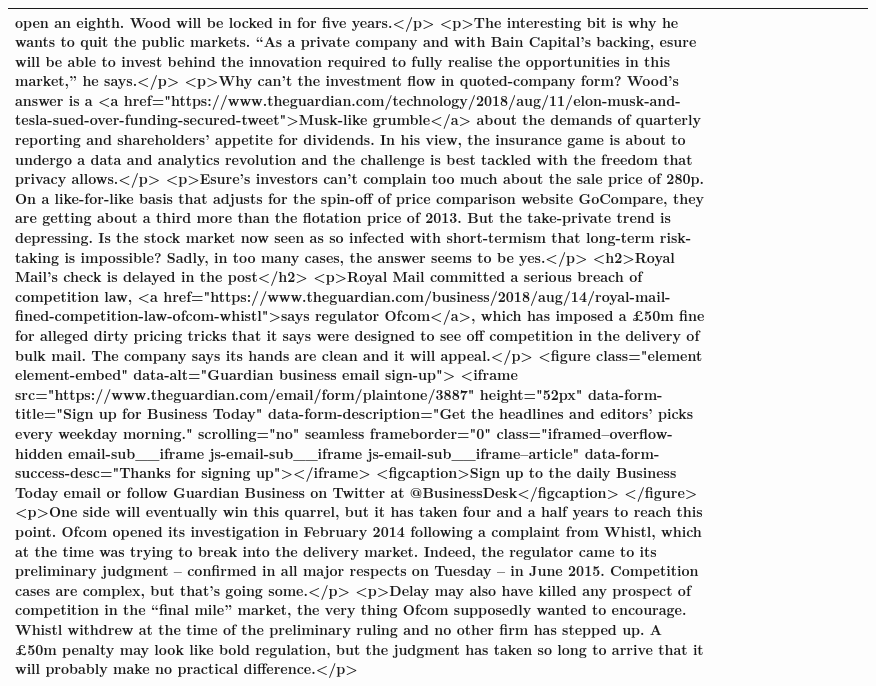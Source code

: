\documentclass[]{article}
\begin{document}
\begin{table}[!h]
\begin{tabular}[t]{llllllllllll}
open an eighth. Wood will be locked in for five years.</p> <p>The interesting bit is why he wants to quit the public markets. “As a private company and with Bain Capital’s backing, esure will be able to invest behind the innovation required to fully realise the opportunities in this market,” he says.</p> <p>Why can’t the investment flow in quoted-company form? Wood’s answer is a <a href="https://www.theguardian.com/technology/2018/aug/11/elon-musk-and-tesla-sued-over-funding-secured-tweet">Musk-like grumble</a> about the demands of quarterly reporting and shareholders’ appetite for dividends. In his view, the insurance game is about to undergo a data and analytics revolution and the challenge is best tackled with the freedom that privacy allows.</p> <p>Esure’s investors can’t complain too much about the sale price of 280p. On a like-for-like basis that adjusts for the spin-off of price comparison website GoCompare, they are getting about a third more than the flotation price of 2013. But the take-private trend is depressing. Is the stock market now seen as so infected with short-termism that long-term risk-taking is impossible? Sadly, in too many cases, the answer seems to be yes.</p> <h2>Royal Mail’s check is delayed in the post</h2> <p>Royal Mail committed a serious breach of competition law, <a href="https://www.theguardian.com/business/2018/aug/14/royal-mail-fined-competition-law-ofcom-whistl">says regulator Ofcom</a>, which has imposed a £50m fine for alleged dirty pricing tricks that it says were designed to see off competition in the delivery of bulk mail. The company says its hands are clean and it will appeal.</p>  <figure class="element element-embed" data-alt="Guardian business email sign-up">  <iframe src="https://www.theguardian.com/email/form/plaintone/3887" height="52px" data-form-title="Sign up for Business Today" data-form-description="Get the headlines and editors' picks every weekday morning." scrolling="no" seamless frameborder="0" class="iframed--overflow-hidden email-sub\_\_iframe js-email-sub\_\_iframe js-email-sub\_\_iframe--article" data-form-success-desc="Thanks for signing up"></iframe> <figcaption>Sign up to the daily Business Today email or follow Guardian Business on Twitter at @BusinessDesk</figcaption> </figure>  <p>One side will eventually win this quarrel, but it has taken four and a half years to reach this point. Ofcom opened its investigation in February 2014 following a complaint from Whistl, which at the time was trying to break into the delivery market. Indeed, the regulator came to its preliminary judgment – confirmed in all major respects on Tuesday – in June 2015. Competition cases are complex, but that’s going some.</p> <p>Delay may also have killed any prospect of competition in the “final mile” market, the very thing Ofcom supposedly wanted to encourage. Whistl withdrew at the time of the preliminary ruling and no other firm has stepped up. A £50m penalty may look like bold regulation, but the judgment has taken so long to arrive that it will probably make no practical difference.</p>\\
\bottomrule
\end{tabular}
\end{table}
\end{document}
